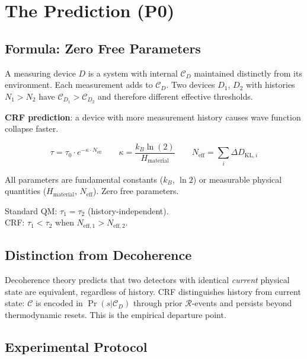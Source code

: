 \documentclass[12pt]{article}
\begin{document}
\section{The Prediction (P0)}

\subsection{Formula: Zero Free Parameters}

A measuring device $D$ is a system with internal $\mathcal{C}_D$
maintained distinctly from its environment. Each measurement adds
to $\mathcal{C}_D$. Two devices $D_1$, $D_2$ with histories
$N_1 > N_2$ have $\mathcal{C}_{D_1} > \mathcal{C}_{D_2}$ and
therefore different effective thresholds.

\begin{predbox}
\textbf{CRF prediction}: a device with more measurement history
causes wave function collapse faster.

\[
  \tau = \tau_0 \cdot e^{-\kappa \cdot N_{\mathrm{eff}}}
  \qquad
  \kappa = \frac{k_B \ln(2)}{H_{\mathrm{material}}}
  \qquad
  N_{\mathrm{eff}} = \sum_i \Delta D_{\mathrm{KL},i}
\]

All parameters are fundamental constants ($k_B$, $\ln 2$) or
measurable physical quantities ($H_{\mathrm{material}}$,
$N_{\mathrm{eff}}$). Zero free parameters.

Standard QM: $\tau_1 = \tau_2$ (history-independent).\\
CRF: $\tau_1 < \tau_2$ when $N_{\mathrm{eff},1} > N_{\mathrm{eff},2}$.
\end{predbox}

\subsection{Distinction from Decoherence}

Decoherence theory predicts that two detectors with identical
\textit{current} physical state are equivalent, regardless of
history. CRF distinguishes history from current state:
$\mathcal{C}$ is encoded in $\Pr(s|\mathcal{C}_D)$ through prior
$\mathcal{R}$-events and persists beyond thermodynamic resets.
This is the empirical departure point.

\subsection{Experimental Protocol}
\end{document}
